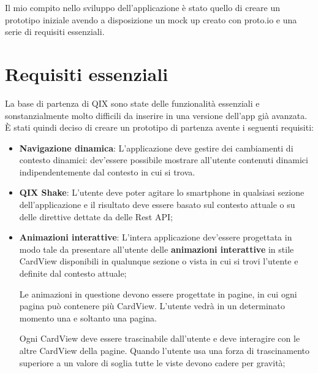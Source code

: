 
Il mio compito nello sviluppo dell'applicazione è stato quello 
di creare un prototipo iniziale avendo a disposizione un mock up creato con
proto.io\cite{protoio} e una serie di requisiti essenziali.

\section{Requisiti essenziali}

La base di partenza di QIX sono state delle funzionalità essenziali e 
sonstanzialmente molto difficili da inserire in una versione dell'app già avanzata.
È stati quindi deciso di creare un prototipo di partenza avente i seguenti requisiti:

\begin{itemize}
    \item {
        \textbf{Navigazione dinamica}: L'applicazione deve gestire dei cambiamenti di contesto
        dinamici: dev'essere possibile mostrare all'utente contenuti dinamici indipendentemente
        dal contesto in cui si trova.
    }
    \item {
        \textbf{QIX Shake}: L'utente deve poter agitare lo smartphone in qualsiasi
        sezione dell'applicazione e il risultato deve essere basato sul contesto attuale o su delle direttive dettate
        da delle Rest API;
    } 
    \item {
        \textbf{Animazioni interattive}: L'intera applicazione dev'essere progettata in modo tale da presentare all'utente
        delle \textbf{animazioni interattive} in stile CardView\cite{cardview} disponibili in 
        qualunque sezione o vista in cui si trovi l'utente e definite dal contesto attuale;

        Le animazioni in questione devono essere progettate in pagine, in cui ogni pagina può contenere 
        più CardView. L'utente vedrà in un determinato momento una e soltanto una pagina.

        Ogni CardView deve essere trascinabile dall'utente e deve interagire con le altre CardView della pagine. 
        Quando l'utente usa una forza di trascinamento superiore a un valore di soglia tutte le viste devono
        cadere per gravità;
        
}
\end{itemize}
